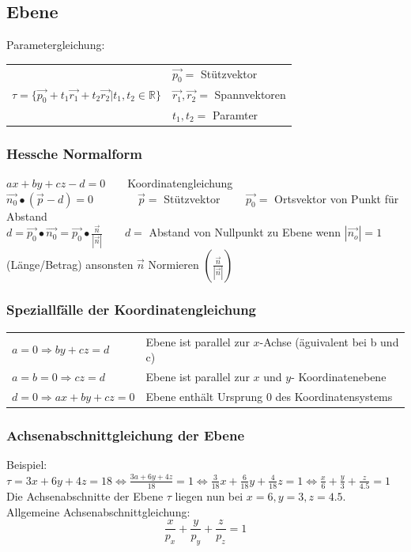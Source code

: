 \subsection{Ebene}
	Parametergleichung: \begin{tabular}{ll}
		& $\vec{p_0} =$ Stützvektor\\
		$\tau = \lbrace\vec{p_0} + t_1\vec{r_1} + t_2\vec{r_2} | t_1, t_2 \in \mathbb{R}\rbrace$ & $\vec{r_1}, \vec{r_2} =$ Spannvektoren \\
		& $t_1, t_2 =$ Paramter
	\end{tabular}


	\subsubsection{Hessche Normalform}
		$ax + by + cz - d = 0 \qquad  $Koordinatengleichung\\
		$\vec{n_0} \bullet (\vec{p} - d) = 0 \qquad \qquad \vec{p} = $ Stützvektor $ \qquad\vec{p_0} = $ Ortsvektor von Punkt für Abstand\\
		$d = \vec{p_0} \bullet \vec{n_0} = \vec{p_0} \bullet \frac{\vec{n}}{|\vec{n}|} \qquad
		d = $ Abstand von Nullpunkt zu Ebene wenn $\left|\vec{n_o}\right| = 1$ (Länge/Betrag) ansonsten $\vec{n}$ Normieren $\left(\frac{\vec{n}}{\left|\vec{n}\right|}\right)$

	\subsubsection{Speziallfälle der Koordinatengleichung}
		\begin{tabular}{ll}
			$a = 0 \Rightarrow by + cz = d$ & Ebene ist parallel zur $x$-Achse (äguivalent bei b und c)\\
			$a = b = 0 \Rightarrow cz = d$ & Ebene ist parallel zur $x$ und $y$- Koordinatenebene\\
			$d = 0 \Rightarrow ax + by + cz = 0$ & Ebene enthält Ursprung 0 des Koordinatensystems
		\end{tabular}

	\subsubsection{Achsenabschnittgleichung der Ebene}
		Beispiel: $\tau = 3x + 6y + 4z = 18 \Leftrightarrow \frac{3a + 6y + 4z}{18} = 1 \Leftrightarrow \frac{3}{18}x + \frac{6}{18}y + \frac{4}{18}z = 1
		\Leftrightarrow \frac{x}{6} + \frac{y}{3} + \frac{z}{4.5} = 1$\\
		Die Achsenabschnitte der Ebene $\tau$ liegen nun bei $x = 6, y = 3, z = 4.5$.\\
		Allgemeine Achsenabschnittgleichung: $$ \frac{x}{p_x} + \frac{y}{p_y} + \frac{z}{p_z} = 1$$

